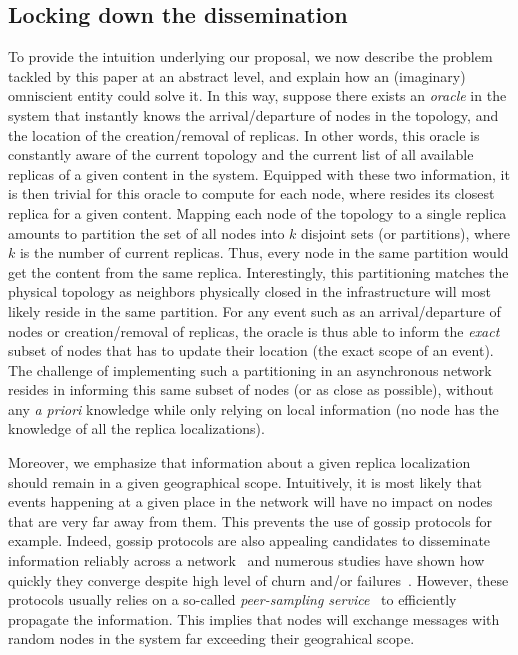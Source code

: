 \subsection*{Locking down the dissemination}
To provide the intuition underlying our proposal, we now describe the problem tackled by this paper at an abstract level, and explain how an (imaginary) omniscient entity could solve it. 
In this way, suppose there exists an \textit{oracle} in the system that instantly knows the arrival/departure of nodes in the topology, and the location of the creation/removal of replicas. In other words, this oracle is constantly aware of the current topology and the current list of all available replicas of a given content in the system. Equipped with these two information, it is then trivial for this oracle to compute for each node, where resides its closest replica for a given content. Mapping each node of the topology to a single replica amounts to partition the set of all nodes into $k$ disjoint sets (or partitions), where $k$ is the number of current replicas. Thus, every node in the same partition would get the content from the same replica. Interestingly, this partitioning matches the physical topology as neighbors physically closed in the infrastructure will most likely reside in the same partition.
For any event such as an arrival/departure of nodes or creation/removal of replicas, the oracle is thus able to inform the \textit{exact} subset of nodes that has to update their location (\ie the exact scope of an event). 
The challenge of implementing such a partitioning in an asynchronous network resides in informing this same subset of nodes (or as close as possible), without any \textit{a priori} knowledge while only relying on local information (\ie no node has the knowledge of all the replica localizations).


Moreover, we emphasize that information about a given replica localization should remain in a given geographical scope. 
Intuitively, it is most likely that events happening at a given place in the network will have no impact on nodes that are very far away from them.
This prevents the use of gossip protocols for example.  Indeed, gossip protocols are also appealing candidates to disseminate information reliably across a network~\cite{epidemic-protocol} and numerous studies have shown how quickly they converge despite high level of churn and/or failures~\cite{lpbcast}.
However, these protocols usually relies on a so-called \textit{peer-sampling service}~\cite{jelasity2007gossip} to efficiently propagate the information. This implies that nodes will exchange messages with random nodes in the system far exceeding their geograhical scope. 
